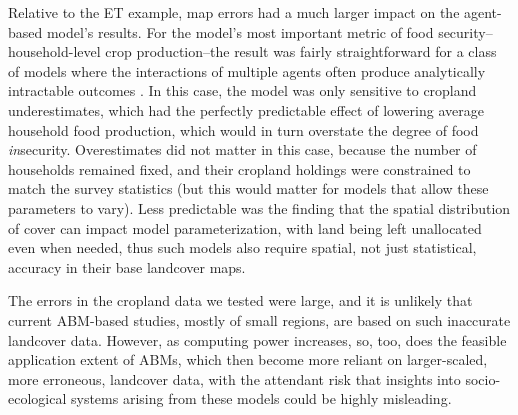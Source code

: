 \documentclass{pnastwo}
\begin{document}
\begin{article}
Relative to the ET example, map errors had a much larger impact on the agent-based model's results. For the model's most important metric of food security--household-level crop production--the result was fairly straightforward for a class of models where the interactions of multiple agents often produce analytically intractable outcomes \cite{janssen_empirically_2006}. In this case, the model was only sensitive to cropland underestimates, which had the perfectly predictable effect of lowering average household food production, which would in turn overstate the degree of food \emph{in}security. Overestimates did not matter in this case, because the number of households remained fixed, and their cropland holdings were constrained to match the survey statistics (but this would matter for models that allow these parameters to vary). Less predictable was the finding that the spatial distribution of cover can impact model parameterization, with land being left unallocated even when needed, thus such models also require spatial, not just statistical, accuracy in their base landcover maps.  

The errors in the cropland data we tested were large, and it is unlikely that current ABM-based studies, mostly of small regions, are based on such inaccurate landcover data. However, as computing power increases, so, too, does the feasible application extent of ABMs, which then become more reliant on larger-scaled, more erroneous, landcover data, with the attendant risk that insights into socio-ecological systems arising from these models could be highly misleading.  


\end{article}
\end{document}
